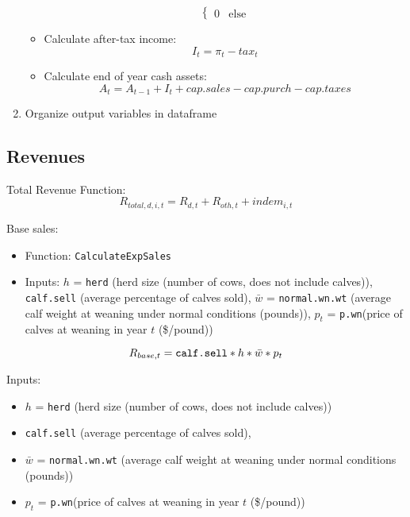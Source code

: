 \documentclass[11pt]{article}
\begin{document}
\begin{enumerate}
\begin{itemize}
\begin{equation}
\begin{cases}
	0 & \text{else}
	\end{cases}
	\end{equation}
	\item Calculate after-tax income:
	\begin{equation}
	I_t = \pi_t - tax_t
	\end{equation}
	\item Calculate end of year cash assets:
	\begin{equation}
	A_{t} = A_{t-1} +  I_t + cap.sales - cap.purch - cap.taxes
	\end{equation}
	\end{itemize}
\item  Organize output variables in dataframe
\end{enumerate}

\subsection{Revenues}
Total Revenue Function:
\begin{equation}
R_{total,d,i,t} = R_{d,t} + R_{oth,t} +  indem_{i,t}
\end{equation}

Base sales: 
\begin{itemize}
\item Function: \verb!CalculateExpSales! 
\item Inputs: $h$ = \verb!herd! (herd size (number of cows, does not include calves)), \verb!calf.sell! (average percentage of calves sold), $\bar{w}$ = \verb!normal.wn.wt! (average calf weight at weaning under normal conditions (pounds)), $p_{t}$ = \verb!p.wn!(price of calves at weaning in year \(t\) (\$/pound))
\end{itemize}

\begin{equation} \label{baserevenues}
R_{base, t} = \verb!calf.sell! * h * \bar{w} * p_t
\end{equation}

Inputs:
\begin{itemize}
\item $h$ = \verb!herd! (herd size (number of cows, does not include calves))
\item \verb!calf.sell! (average percentage of calves sold), 
\item $\bar{w}$ = \verb!normal.wn.wt! (average calf weight at weaning under normal conditions (pounds))
\item $p_{t}$ = \verb!p.wn!(price of calves at weaning in year \(t\) (\$/pound))
\end{itemize}
\end{document}
